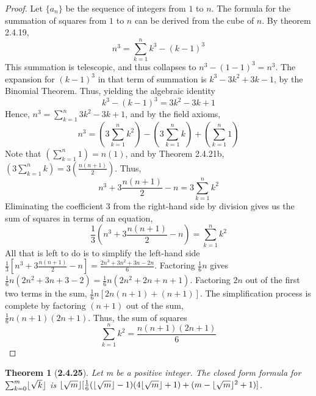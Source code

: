 \documentclass[a4paper, 12pt]{article}
\theoremstyle{plain}
\newtheorem*{theorem*}{Theorem}
\DeclarePairedDelimiter{\floor}{\lfloor}{\rfloor}
\begin{document}
\begin{proof}
    Let $\{a_n\}$ be the sequence of integers from $1$ to $n$. The formula for the 
    summation of squares from $1$ to $n$ can be derived from the cube of $n$. By 
    theorem 2.4.19, $$n^3 = \sum_{k=1}^{n} k^3 - (k-1)^3$$ This summation is 
    telescopic, and thus collapses to $n^3 - (1 - 1)^3 = n^3$. The expansion for 
    $(k-1)^3$ in that term of summation is $k^{3} - 3k^{2} + 3k - 1$, by the Binomial 
    Theorem. Thus, yielding the algebraic identity 
    $$k^{3} - (k - 1)^{3} = 3k^{2} - 3k + 1$$ Hence, 
    $n^{3} = \sum_{k=1}^{n} 3k^{2} - 3k + 1$, and by the field axioms,
    $$n^{3} = \left(3\sum_{k=1}^{n} k^{2}\right) - \left(3\sum_{k=1}^{n} k\right) + \left(\sum_{k=1}^{n} 1\right)$$
    Note that $(\sum_{k=1}^n 1) = n(1)$, and by Theorem 2.4.21b, 
    $(3\sum_{k=1}^{n} k) = 3(\frac{n(n+1)}{2})$. Thus, 
    $$n^{3} + 3\frac{n(n+1)}{2} - n = 3\sum_{k=1}^{n} k^{2}$$
    Eliminating the coefficient 
    $3$ from the right-hand side by division gives us the sum of squares in terms of an 
    equation, $$\frac{1}{3}\left(n^{3} + 3\frac{n(n+1)}{2} - n\right) = \sum_{k=1}^{n} k^{2}$$ 
    All that is left to do is to simplify the left-hand side 
    $\frac{1}{3}[n^{3} + 3\frac{n(n+1)}{2} - n] = \frac{2n^{3} + 3n^{2} + 3n - 2n}{6}$. 
    Factoring $\frac{1}{6}n$ gives 
    $\frac{1}{6}n(2n^{2} + 3n + 3 - 2) = \frac{1}{6}n(2n^{2} + 2n + n + 1)$. Factoring $2n$
    out of the first two terms in the sum, $\frac{1}{6}n[2n(n + 1) + (n + 1)]$. The 
    simplification process is complete by factoring $(n+1)$ out of the sum, \\ 
    $\frac{1}{6}n(n+1)(2n+1)$. Thus, the sum of squares $$\sum_{k=1}^{n} k^{2} = 
    \frac{n(n+1)(2n+1)}{6}$$
\end{proof}

\pagebreak


\begin{theorem*}[\textbf{2.4.25}]
    Let m be a positive integer. The closed form formula for $\sum_{k=0}^{m} \floor{\sqrt{k}}$ 
    is $\floor{\sqrt{m}}[\frac{1}{6}(\floor{\sqrt{m}}-1)(4\floor{\sqrt{m}}+1) + 
    (m - \floor{\sqrt{m}}^{2} + 1)]$.
\end{theorem*}
\end{document}
